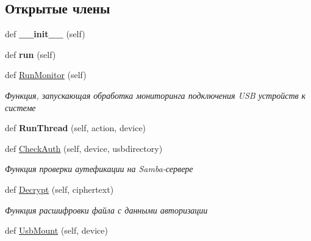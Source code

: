 \subsection*{Открытые члены}
\begin{DoxyCompactItemize}
\item 
\mbox{\label{classisofc-service-2_1_1DeviceHandler_a061cfb786c74e313a8cfb4e56c6f7185}} 
def {\bfseries \+\_\+\+\_\+init\+\_\+\+\_\+} (self)
\item 
\mbox{\label{classisofc-service-2_1_1DeviceHandler_a60fb1b67d21c9f460665a7afd0cf0f18}} 
def {\bfseries run} (self)
\item 
\mbox{\label{classisofc-service-2_1_1DeviceHandler_a6b69b0878532d25a12384f836181cd40}} 
def \mbox{\hyperlink{classisofc-service-2_1_1DeviceHandler_a6b69b0878532d25a12384f836181cd40}{Run\+Monitor}} (self)
\begin{DoxyCompactList}\small\item\em Функция, запускающая обработка мониторинга подключения U\+SB устройств к системе \end{DoxyCompactList}\item 
\mbox{\label{classisofc-service-2_1_1DeviceHandler_ada5463d9cb3227033f0f264baa7ff853}} 
def {\bfseries Run\+Thread} (self, action, device)
\item 
def \mbox{\hyperlink{classisofc-service-2_1_1DeviceHandler_ac8c924e28f64f20f5a80c71aeca434b3}{Check\+Auth}} (self, device, usbdirectory)
\begin{DoxyCompactList}\small\item\em Функция проверки аутефикации на Samba-\/сервере \end{DoxyCompactList}\item 
def \mbox{\hyperlink{classisofc-service-2_1_1DeviceHandler_a0c5e62236097f3afa184be6bfbc61495}{Decrypt}} (self, ciphertext)
\begin{DoxyCompactList}\small\item\em Функция расшифровки файла с данными авторизации \end{DoxyCompactList}\item 
def \mbox{\hyperlink{classisofc-service-2_1_1DeviceHandler_a54a0e6f35c2bf9619c532a5940706655}{Usb\+Mount}} (self, device)

\end{DoxyCompactItemize}

